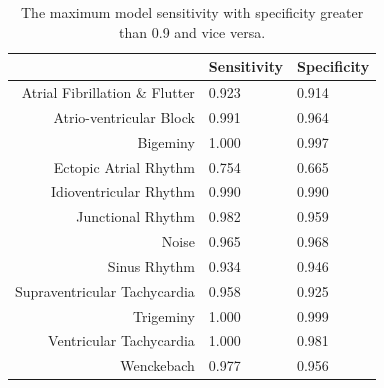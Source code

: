 \begin{table}
\centering
\begin{small}
\begin{tabular}{r l l}
\toprule
             & Sensitivity       & Specificity  \\
\midrule
Atrial Fibrillation \& Flutter & 0.923 & 0.914 \\
Atrio-ventricular Block        & 0.991 & 0.964 \\
Bigeminy                       & 1.000 & 0.997 \\
Ectopic Atrial Rhythm          & 0.754 & 0.665 \\
Idioventricular Rhythm         & 0.990 & 0.990 \\
Junctional Rhythm              & 0.982 & 0.959 \\
Noise                          & 0.965 & 0.968 \\
Sinus Rhythm                   & 0.934 & 0.946 \\
Supraventricular Tachycardia   & 0.958 & 0.925 \\
Trigeminy                      & 1.000 & 0.999 \\
Ventricular Tachycardia        & 1.000 & 0.981 \\
Wenckebach                     & 0.977 & 0.956 \\
\bottomrule
\end{tabular}
\end{small}
\caption{The maximum model sensitivity with specificity greater than 0.9 and
         vice versa.}
\label{tab:arrhythmias:sens_spec}
\end{table}

